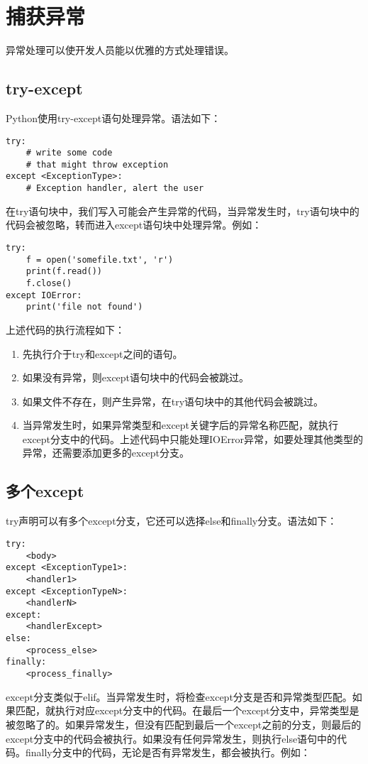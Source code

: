 \section{捕获异常}
异常处理可以使开发人员能以优雅的方式处理错误。

\subsection{try-except}
Python使用try-except语句处理异常。语法如下：

\begin{lstlisting}
try:
    # write some code
    # that might throw exception
except <ExceptionType>:
    # Exception handler, alert the user
\end{lstlisting}

在try语句块中，我们写入可能会产生异常的代码，当异常发生时，try语句块中的代码会被忽略，转而进入except语句块中处理异常。例如：

\begin{lstlisting}
try:
    f = open('somefile.txt', 'r')
    print(f.read())
    f.close()
except IOError:
    print('file not found')
\end{lstlisting}

上述代码的执行流程如下：
\begin{enumerate}
	\item 先执行介于try和except之间的语句。
	\item 如果没有异常，则except语句块中的代码会被跳过。
	\item 如果文件不存在，则产生异常，在try语句块中的其他代码会被跳过。
	\item 当异常发生时，如果异常类型和except关键字后的异常名称匹配，就执行except分支中的代码。上述代码中只能处理IOError异常，如要处理其他类型的异常，还需要添加更多的except分支。
\end{enumerate}

\subsection{多个except}
try声明可以有多个except分支，它还可以选择else和finally分支。语法如下：

\begin{lstlisting}
try:
    <body>
except <ExceptionType1>:
    <handler1>
except <ExceptionTypeN>:
    <handlerN>
except:
    <handlerExcept>
else:
    <process_else>
finally:
    <process_finally>
\end{lstlisting}

except分支类似于elif。当异常发生时，将检查except分支是否和异常类型匹配。如果匹配，就执行对应except分支中的代码。在最后一个except分支中，异常类型是被忽略了的。如果异常发生，但没有匹配到最后一个except之前的分支，则最后的except分支中的代码会被执行。如果没有任何异常发生，则执行else语句中的代码。finally分支中的代码，无论是否有异常发生，都会被执行。例如：

